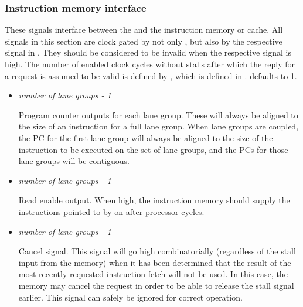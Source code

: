 
\subsubsection{Instruction memory interface}
\label{sec:core-ug-cfg-inst-iface-imem}

These signals interface between the \rvex{} and the instruction memory or cache. 
All signals in this section are clock gated by not only , but also 
by the respective signal in . They should be considered to 
be invalid when the respective  signal is high. The number 
of enabled clock cycles without stalls after which the reply for a request is 
assumed to be valid is defined by , which is defined in 
.  defaults to 1.

\begin{itemize}

\item {}\textit{number of lane groups - 1}

Program counter outputs for each lane group. These will always be aligned to the 
size of an instruction for a full lane group. When lane groups are coupled, the 
PC for the first lane group will always be aligned to the size of the 
instruction to be executed on the set of lane groups, and the PCs for those lane 
groups will be contiguous.

\vspace{1em}
\item {}\textit{number of lane groups - 1}

Read enable output. When high, the instruction memory should supply the 
instructions pointed to by  on  after 
 processor cycles.

\vspace{1em}
\item {}\textit{number of lane groups - 1}

Cancel signal. This signal will go high combinatorially (regardless of the stall 
input from the memory) when it has been determined that the result of the most 
recently requested instruction fetch will not be used. In this case, the memory 
may cancel the request in order to be able to release the stall signal earlier. 
This signal can safely be ignored for correct operation.


\end{itemize}
